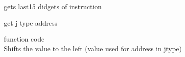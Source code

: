 gets last15 didgets of instruction

get j type address

function code ~\newline
~\newline
~\newline
~\newline
~\newline
~\newline
~\newline
~\newline
~\newline
~\newline
~\newline
~\newline
~\newline
~\newline
~\newline
~\newline
~\newline
~\newline
~\newline
~\newline
~\newline
~\newline
~\newline
~\newline
~\newline
~\newline
~\newline
~\newline
~\newline
~\newline
~\newline
~\newline
~\newline
~\newline
 Shifts the value to the left (value used for address in jtype)


